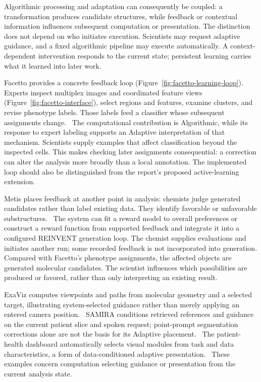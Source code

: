 Algorithmic processing and adaptation can consequently be coupled: a transformation produces candidate structures, while feedback or contextual information influences subsequent computation or presentation. The distinction does not depend on who initiates execution. Scientists may request adaptive guidance, and a fixed algorithmic pipeline may execute automatically. A context-dependent intervention responds to the current state; persistent learning carries what it learned into later work.

Facetto provides a concrete feedback loop (Figure~\ref{fig:facetto-learning-loop}). Experts inspect multiplex images and coordinated feature views (Figure~\ref{fig:facetto-interface}), select regions and features, examine clusters, and revise phenotype labels. Those labels feed a classifier whose subsequent assignments change.~\cite{AnchorFacetto} The computational contribution is Algorithmic, while its response to expert labeling supports an Adaptive interpretation of that mechanism. Scientists supply examples that affect classification beyond the inspected cells. This makes checking later assignments consequential: a correction can alter the analysis more broadly than a local annotation. The implemented loop should also be distinguished from the report's proposed active-learning extension.



Metis places feedback at another point in analysis: chemists judge generated candidates rather than label existing data. They identify favorable or unfavorable substructures.~\cite{AnchorMetis} The system can fit a reward model to overall preferences or construct a reward function from supported feedback and integrate it into a configured REINVENT generation loop. The chemist supplies evaluations and initiates another run; some recorded feedback is not incorporated into generation. Compared with Facetto’s phenotype assignments, the affected objects are generated molecular candidates. The scientist influences which possibilities are produced or favored, rather than only interpreting an existing result.



ExaViz computes viewpoints and paths from molecular geometry and a selected target, illustrating system-selected guidance rather than merely applying an entered camera position.~\cite{MapExaViz} SAMIRA conditions retrieved references and guidance on the current patient slice and spoken request; point-prompt segmentation corrections alone are not the basis for its Adaptive placement.~\cite{MapSAMIRA} The patient-health dashboard automatically selects visual modules from task and data characteristics, a form of data-conditioned adaptive presentation.~\cite{MapDashboard} These examples concern computation selecting guidance or presentation from the current analysis state.

